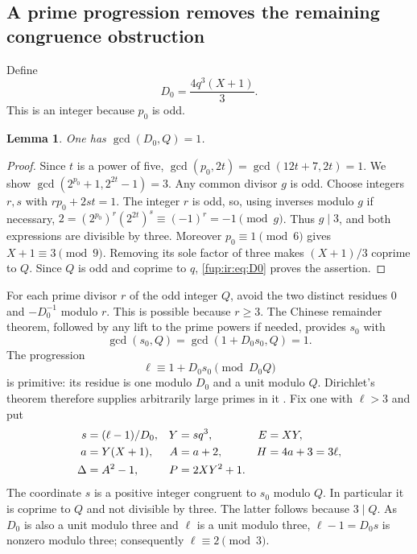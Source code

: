 \documentclass[11pt,letterpaper]{article}
\newtheorem{lemma}[theorem]{Lemma}
\theoremstyle{definition}\newtheorem{definition}[theorem]{Definition}
\theoremstyle{remark}\newtheorem{remark}[theorem]{Remark}
\begin{document}
\subsection{A prime progression removes the remaining congruence obstruction}
Define
\begin{equation}\label{fup:ir:eq:D0}
 D_0=\frac{4q^3(X+1)}3.
\end{equation}
This is an integer because $p_0$ is odd.

\begin{lemma}\label{fup:ir:lem:scalegcd}
One has $\gcd(D_0,Q)=1$.
\end{lemma}
\begin{proof}
Since $t$ is a power of five,
$\gcd(p_0,2t)=\gcd(12t+7,2t)=1$.
We show $\gcd(2^{p_0}+1,2^{2t}-1)=3$. Any common divisor $g$ is odd. Choose integers $r,s$ with $rp_0+2st=1$. The integer $r$ is odd, so, using inverses modulo $g$ if necessary,
$2=(2^{p_0})^r(2^{2t})^s\equiv(-1)^r=-1\pmod g$.
Thus $g\mid3$, and both expressions are divisible by three. Moreover $p_0\equiv1\pmod6$ gives $X+1\equiv3\pmod9$. Removing its sole factor of three makes $(X+1)/3$ coprime to $Q$. Since $Q$ is odd and coprime to $q$, \eqref{fup:ir:eq:D0} proves the assertion.
\end{proof}
For each prime divisor $r$ of the odd integer $Q$, avoid the two distinct residues $0$ and $-D_0^{-1}$ modulo $r$. This is possible because $r\ge3$. The Chinese remainder theorem, followed by any lift to the prime powers if needed, provides $s_0$ with
\begin{equation}\label{fup:ir:eq:s0}
 \gcd(s_0,Q)=\gcd(1+D_0s_0,Q)=1.
\end{equation}
The progression
\begin{equation}\label{fup:ir:eq:primeAP}
 \ell\equiv1+D_0s_0\pmod{D_0Q}
\end{equation}
is primitive: its residue is one modulo $D_0$ and a unit modulo $Q$. Dirichlet's theorem therefore supplies arbitrarily large primes in it \cite{fup:ir:dirichlet}. Fix one with $\ell>3$ and put
\begin{align}
 s&=(\ell-1)/D_0,&Y&=sq^3,&E&=XY,\label{fup:ir:eq:Y}\\
 a&=Y(X+1),&A&=a+2,&H&=4a+3=3\ell,\notag\\
 \Delta&=A^2-1,&P&=2XY^2+1.&&\notag
\end{align}
The coordinate $s$ is a positive integer congruent to $s_0$ modulo $Q$. In particular it is coprime to $Q$ and not divisible by three. The latter follows because $3\mid Q$. As $D_0$ is also a unit modulo three and $\ell$ is a unit modulo three, $\ell-1=D_0s$ is nonzero modulo three; consequently $\ell\equiv2\pmod3$.
\end{document}
